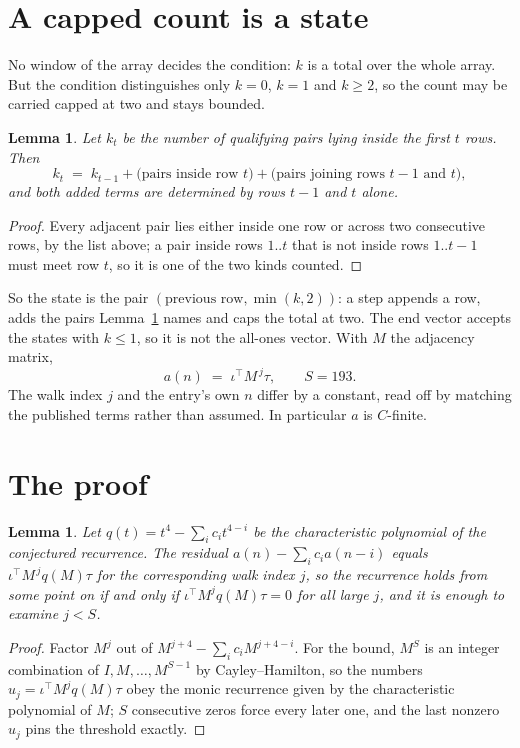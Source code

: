 \documentclass[11pt,a4paper]{article}
\theoremstyle{plain}
\newtheorem{lemma}[theorem]{Lemma}
\theoremstyle{definition}
\begin{document}
\section{A capped count is a state}

No window of the array decides the condition: $k$ is a total over the whole array. But the
condition distinguishes only $k=0$, $k=1$ and $k\ge2$, so the count may be carried capped at
two and stays bounded.

\begin{lemma}\label{lem:cap}
Let $k_t$ be the number of qualifying pairs lying inside the first $t$ rows. Then
\[
k_{t}\;=\;k_{t-1}+\bigl(\text{pairs inside row } t\bigr)
+\bigl(\text{pairs joining rows } t-1 \text{ and } t\bigr),
\]
and both added terms are determined by rows $t-1$ and $t$ alone.
\end{lemma}

\begin{proof}
Every adjacent pair lies either inside one row or across two consecutive rows, by the list
above; a pair inside rows $1..t$ that is not inside rows $1..t-1$ must meet row $t$, so it is
one of the two kinds counted.
\end{proof}

So the state is the pair $(\text{previous row},\min(k,2))$: a step appends a row, adds the
pairs Lemma~\ref{lem:cap} names and caps the total at two. The end vector accepts the states
with $k\le1$, so it is not the all-ones vector. With $M$ the adjacency matrix,
\[
a(n)\;=\;\iota^{\!\top}M^{\,j}\tau ,\qquad S=193.
\]
The walk index $j$ and the entry's own $n$ differ by a constant, read off by matching the
published terms rather than assumed. In particular $a$ is $C$-finite.

\section{The proof}

\begin{lemma}\label{lem:crit}
Let $q(t)=t^{4}-\sum_i c_it^{4-i}$ be the characteristic polynomial of the
conjectured recurrence. The residual $a(n)-\sum_ic_ia(n-i)$ equals
$\iota^{\!\top}M^{\,j}q(M)\tau$ for the corresponding walk index $j$, so the recurrence
holds from some point on if and only if $\iota^{\!\top}M^{j}q(M)\tau=0$ for all large $j$,
and it is enough to examine $j<S$.
\end{lemma}

\begin{proof}
Factor $M^{j}$ out of $M^{j+4}-\sum_ic_iM^{j+4-i}$. For the bound, $M^{S}$
is an integer combination of $I,M,\dots,M^{S-1}$ by Cayley--Hamilton, so the numbers
$u_j=\iota^{\!\top}M^{j}q(M)\tau$ obey the monic recurrence given by the characteristic
polynomial of $M$; $S$ consecutive zeros force every later one, and the last nonzero $u_j$
pins the threshold exactly.
\end{proof}
\end{document}

